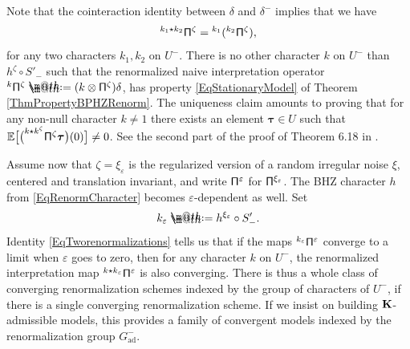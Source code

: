 \documentclass[10pt, reqno]{amsart}
\makeatletter
\numberwithin{subsection}{section}
\numberwithin{subsubsection}{subsection}
\numberwithin{equation}{section} %
\newenvironment{Rem}[1][\unskip]{%
    \begin{list}{\hspace{1.15cm}{\textsf{\textbf{{\small \textsl{Remark}} 
--}}}}{%
        \setlength{\topsep}{0pt}%
        \setlength{\leftmargin}{0pt}%
        \setlength{\rightmargin}{0pt}%
        \setlength{\listparindent}{0pt}%
        \setlength{\itemindent}{0pt}%
        \setlength{\parsep}{0pt}%
        \addtolength{\leftmargin}{0pt}%
        \addtolength{\rightmargin}{0pt}%
    } \item }{\hfill \end{list}\smallskip}
\theoremstyle{mystyle}
\theoremstyle{mystyle2}
\theoremstyle{mystyle3}
\newcommand{\bstau}{\boldsymbol{\tau}}
\renewcommand{\epsilon}{\varepsilon}
\newcommand\bbE{\mathbb{E}}
\newcommand*{\defeq}{\mathrel{\rlap{%
                     \raisebox{0.3ex}{$\m@th\cdot$}}%
                     \raisebox{-0.3ex}{$\m@th\cdot$}}%
                     =}
\makeatother
\begin{document}
\medskip

{\small {\sl \begin{Rem} 
Note that the cointeraction identity between $\delta$ and $\delta^-$ implies that we have 
\begin{equation}  \label{EqTworenormalizations}
^{k_1\star k_2}{\sf \Pi}^\zeta = {^{k_1}({^{k_2}{\sf \Pi}^\zeta})},
\end{equation}
for any two characters $k_1,k_2$ on $U^-$. There is no other character $k$ on $U^-$ than $h^\zeta\circ S'_-$ such that the renormalized naive interpretation operator $^k{\sf \Pi}^\zeta \defeq  
(k\otimes {\sf \Pi}^\zeta)\delta$, has property \eqref{EqStationaryModel} 
of Theorem \ref{ThmPropertyBPHZRenorm}. The uniqueness claim amounts to proving that for any non-null character $k\neq 1$ there exists an 
element $\bstau\in U$ such that $\bbE\big[\big(^{k\star k^\zeta}{\sf \Pi}^\zeta\bstau\big)(0)\big]\neq 0$. See the second part of the proof of Theorem 6.18 in \cite{BHZ}. 
\end{Rem}}}

\medskip

Assume now that $\zeta=\xi_\epsilon$ is the regularized version of a random irregular noise $\xi$, centered and translation invariant, and write 
${\sf \Pi}^\epsilon$ for ${\sf \Pi}^{\xi_\epsilon}$. The BHZ character $h$ from \eqref{EqRenormCharacter} becomes $\epsilon$-dependent as well. Set 
\begin{equation} \label{EqDefnKEpsilon}
k_\epsilon \defeq  h^{\xi_\epsilon}\circ S'_-.
\end{equation}
Identity \eqref{EqTworenormalizations} tells us that if the maps $^{k_\epsilon}{\sf \Pi}^\epsilon$ converge to a limit when $\epsilon$ goes to zero, then for any character $k$ on $U^-$, the renormalized interpretation map $^{k\star k_\epsilon}{\sf \Pi}^\epsilon$ is also converging. There is thus a whole class of converging renormalization schemes indexed by the group of characters of $U^-$, if there is a single converging renormalization scheme. If we insist on building $\bf K$-admissible models, this provides a family of convergent models indexed by the renormalization group $G^-_\textrm{ad}$.   

\medskip
\end{document}
